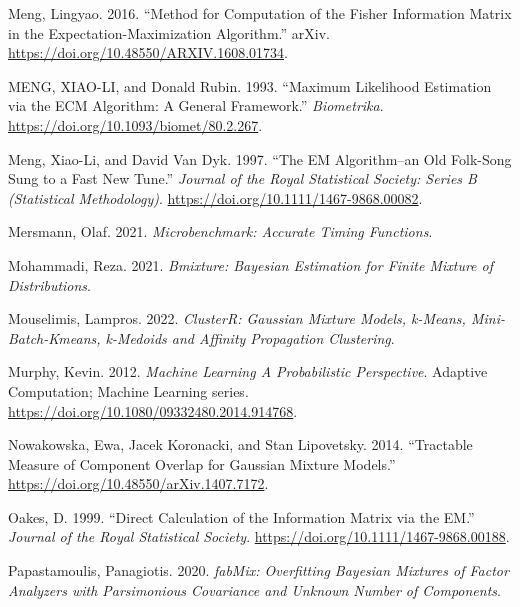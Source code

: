 \begin{CSLReferences}{1}{0}
\leavevmode{}%
Meng, Lingyao. 2016. {``Method for Computation of the Fisher Information Matrix in the Expectation-Maximization Algorithm.''} arXiv. \url{https://doi.org/10.48550/ARXIV.1608.01734}.

\leavevmode{}%
MENG, XIAO-LI, and Donald Rubin. 1993. {``Maximum {Likelihood Estimation} via the {ECM Algorithm}: {A General Framework}.''} \emph{Biometrika}. \url{https://doi.org/10.1093/biomet/80.2.267}.

\leavevmode{}%
Meng, Xiao-Li, and David Van Dyk. 1997. {``The {EM} {Algorithm}--an {Old} {Folk}-Song {Sung} to a {Fast} {New} {Tune}.''} \emph{Journal of the Royal Statistical Society: Series B (Statistical Methodology)}. \url{https://doi.org/10.1111/1467-9868.00082}.

\leavevmode{}%
Mersmann, Olaf. 2021. \emph{Microbenchmark: Accurate Timing Functions}.

\leavevmode{}%
Mohammadi, Reza. 2021. \emph{Bmixture: Bayesian Estimation for Finite Mixture of Distributions}.

\leavevmode{}%
Mouselimis, Lampros. 2022. \emph{ClusterR: Gaussian Mixture Models, k-Means, Mini-Batch-Kmeans, k-Medoids and Affinity Propagation Clustering}.

\leavevmode{}%
Murphy, Kevin. 2012. \emph{Machine {Learning A Probabilistic Perspective}}. Adaptive Computation; Machine Learning series. \url{https://doi.org/10.1080/09332480.2014.914768}.

\leavevmode{}%
Nowakowska, Ewa, Jacek Koronacki, and Stan Lipovetsky. 2014. {``Tractable {Measure} of {Component Overlap} for {Gaussian Mixture Models}.''} \url{https://doi.org/10.48550/arXiv.1407.7172}.

\leavevmode{}%
Oakes, D. 1999. {``Direct Calculation of the Information Matrix via the {EM}.''} \emph{Journal of the Royal Statistical Society}. \url{https://doi.org/10.1111/1467-9868.00188}.

\leavevmode{}%
Papastamoulis, Panagiotis. 2020. \emph{fabMix: Overfitting Bayesian Mixtures of Factor Analyzers with Parsimonious Covariance and Unknown Number of Components}.


\end{CSLReferences}
